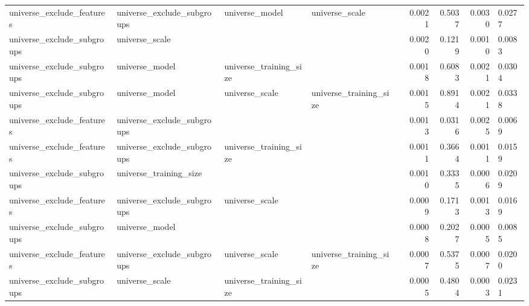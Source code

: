 \begin{table}
\begin{tabular}{llllrrrr}
 universe\_exclude\_features & universe\_exclude\_subgroups &         universe\_model &         universe\_scale &                        &                0.0021 &           0.5037 &         0.0030 &    0.0277 \\
universe\_exclude\_subgroups &             universe\_scale &                        &                        &                        &                0.0020 &           0.1219 &         0.0010 &    0.0083 \\
universe\_exclude\_subgroups &             universe\_model & universe\_training\_size &                        &                        &                0.0018 &           0.6083 &         0.0021 &    0.0304 \\
universe\_exclude\_subgroups &             universe\_model &         universe\_scale & universe\_training\_size &                        &                0.0015 &           0.8914 &         0.0021 &    0.0338 \\
 universe\_exclude\_features & universe\_exclude\_subgroups &                        &                        &                        &                0.0013 &           0.0316 &         0.0025 &    0.0069 \\
 universe\_exclude\_features & universe\_exclude\_subgroups & universe\_training\_size &                        &                        &                0.0011 &           0.3664 &         0.0011 &    0.0159 \\
universe\_exclude\_subgroups &     universe\_training\_size &                        &                        &                        &                0.0010 &           0.3335 &         0.0006 &    0.0209 \\
 universe\_exclude\_features & universe\_exclude\_subgroups &         universe\_scale &                        &                        &                0.0009 &           0.1713 &         0.0013 &    0.0169 \\
universe\_exclude\_subgroups &             universe\_model &                        &                        &                        &                0.0008 &           0.2027 &         0.0005 &    0.0085 \\
 universe\_exclude\_features & universe\_exclude\_subgroups &         universe\_scale & universe\_training\_size &                        &                0.0007 &           0.5375 &         0.0007 &    0.0200 \\
universe\_exclude\_subgroups &             universe\_scale & universe\_training\_size &                        &                        &                0.0005 &           0.4804 &         0.0003 &    0.0231 \\
\bottomrule
\end{tabular}
\end{table}
